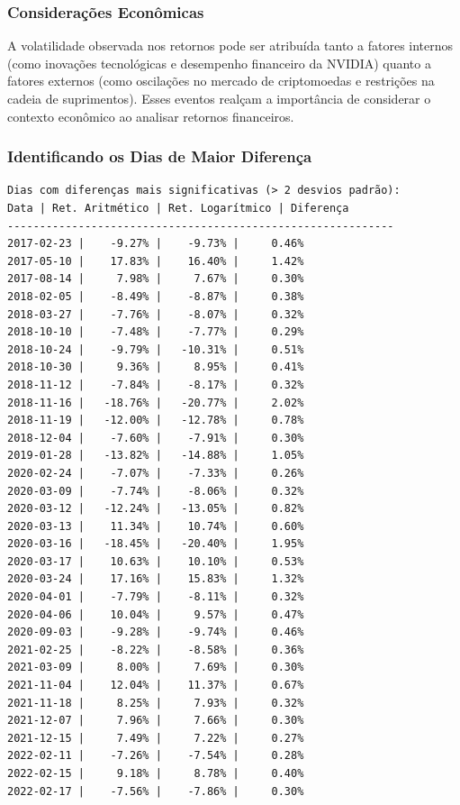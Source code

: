 \documentclass[a4paper, 12pt]{article}
\begin{document}
\subsubsection{Considerações Econômicas}
A volatilidade observada nos retornos pode ser atribuída tanto a fatores internos (como inovações tecnológicas e desempenho financeiro da NVIDIA) quanto a fatores externos (como oscilações no mercado de criptomoedas e restrições na cadeia de suprimentos). Esses eventos realçam a importância de considerar o contexto econômico ao analisar retornos financeiros.


\subsubsection{Identificando os Dias de Maior Diferença}


\begin{verbatim}
Dias com diferenças mais significativas (> 2 desvios padrão):
Data | Ret. Aritmético | Ret. Logarítmico | Diferença
------------------------------------------------------------
2017-02-23 |    -9.27% |    -9.73% |     0.46%
2017-05-10 |    17.83% |    16.40% |     1.42%
2017-08-14 |     7.98% |     7.67% |     0.30%
2018-02-05 |    -8.49% |    -8.87% |     0.38%
2018-03-27 |    -7.76% |    -8.07% |     0.32%
2018-10-10 |    -7.48% |    -7.77% |     0.29%
2018-10-24 |    -9.79% |   -10.31% |     0.51%
2018-10-30 |     9.36% |     8.95% |     0.41%
2018-11-12 |    -7.84% |    -8.17% |     0.32%
2018-11-16 |   -18.76% |   -20.77% |     2.02%
2018-11-19 |   -12.00% |   -12.78% |     0.78%
2018-12-04 |    -7.60% |    -7.91% |     0.30%
2019-01-28 |   -13.82% |   -14.88% |     1.05%
2020-02-24 |    -7.07% |    -7.33% |     0.26%
2020-03-09 |    -7.74% |    -8.06% |     0.32%
2020-03-12 |   -12.24% |   -13.05% |     0.82%
2020-03-13 |    11.34% |    10.74% |     0.60%
2020-03-16 |   -18.45% |   -20.40% |     1.95%
2020-03-17 |    10.63% |    10.10% |     0.53%
2020-03-24 |    17.16% |    15.83% |     1.32%
2020-04-01 |    -7.79% |    -8.11% |     0.32%
2020-04-06 |    10.04% |     9.57% |     0.47%
2020-09-03 |    -9.28% |    -9.74% |     0.46%
2021-02-25 |    -8.22% |    -8.58% |     0.36%
2021-03-09 |     8.00% |     7.69% |     0.30%
2021-11-04 |    12.04% |    11.37% |     0.67%
2021-11-18 |     8.25% |     7.93% |     0.32%
2021-12-07 |     7.96% |     7.66% |     0.30%
2021-12-15 |     7.49% |     7.22% |     0.27%
2022-02-11 |    -7.26% |    -7.54% |     0.28%
2022-02-15 |     9.18% |     8.78% |     0.40%
2022-02-17 |    -7.56% |    -7.86% |     0.30%

\end{verbatim}
\end{document}

